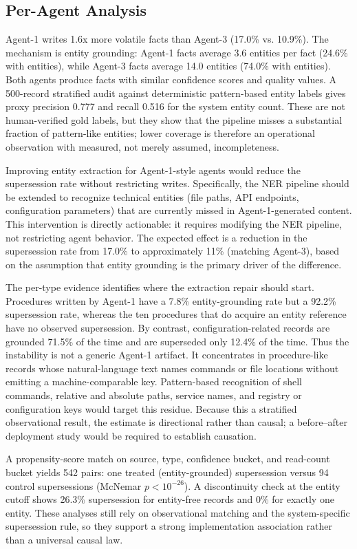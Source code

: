 \documentclass{llncs}
\begin{document}
\subsection{Per-Agent Analysis}


Agent-1 writes 1.6x more volatile facts than Agent-3 (17.0\% vs. 10.9\%). The mechanism is entity grounding: Agent-1 facts average 3.6 entities per fact (24.6\% with entities), while Agent-3 facts average 14.0 entities (74.0\% with entities). Both agents produce facts with similar confidence scores and quality values. A 500-record stratified audit against deterministic pattern-based entity labels gives proxy precision 0.777 and recall 0.516 for the system entity count. These are not human-verified gold labels, but they show that the pipeline misses a substantial fraction of pattern-like entities; lower coverage is therefore an operational observation with measured, not merely assumed, incompleteness.

Improving entity extraction for Agent-1-style agents would reduce the supersession rate without restricting writes. Specifically, the NER pipeline should be extended to recognize technical entities (file paths, API endpoints, configuration parameters) that are currently missed in Agent-1-generated content. This intervention is directly actionable: it requires modifying the NER pipeline, not restricting agent behavior. The expected effect is a reduction in the supersession rate from 17.0\% to approximately 11\% (matching Agent-3), based on the assumption that entity grounding is the primary driver of the difference.

The per-type evidence identifies where the extraction repair should start. Procedures written by Agent-1 have a 7.8\% entity-grounding rate but a 92.2\% supersession rate, whereas the ten procedures that do acquire an entity reference have no observed supersession. By contrast, configuration-related records are grounded 71.5\% of the time and are superseded only 12.4\% of the time. Thus the instability is not a generic Agent-1 artifact. It concentrates in procedure-like records whose natural-language text names commands or file locations without emitting a machine-comparable key. Pattern-based recognition of shell commands, relative and absolute paths, service names, and registry or configuration keys would target this residue. Because this a stratified observational result, the estimate is directional rather than causal; a before--after deployment study would be required to establish causation.

A propensity-score match on source, type, confidence bucket, and read-count bucket yields 542 pairs: one treated (entity-grounded) supersession versus 94 control supersessions (McNemar $p<10^{-26}$). A discontinuity check at the entity cutoff shows 26.3\% supersession for entity-free records and 0\% for exactly one entity. These analyses still rely on observational matching and the system-specific supersession rule, so they support a strong implementation association rather than a universal causal law. 
\end{document}
